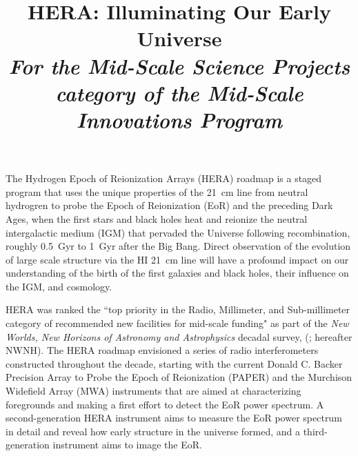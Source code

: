 \documentclass[preprint]{aastex}
\def\HI{{H{\small I }}}
\begin{document}
\title{HERA: Illuminating Our Early Universe\\
{\it For the Mid-Scale Science Projects category of the Mid-Scale Innovations Program}} 



{ \setlength{\parindent}{0cm}
The Hydrogen Epoch of Reionization Arrays (HERA) roadmap is a staged
program that uses the unique properties of the 21~cm line from neutral
hydrogren to probe the 
Epoch of Reionization (EoR) and the preceding Dark Ages,
when the first stars and black holes heat and reionize the
neutral intergalactic medium (IGM) that pervaded the Universe following recombination, roughly
0.5~Gyr to 1~Gyr after the Big Bang. Direct observation of the evolution of
large scale structure via the \HI 21~cm line will have a profound impact on our
understanding of the birth of the first galaxies and black holes, their
influence on the IGM, and cosmology.}  

HERA was ranked the ``top priority in the Radio, Millimeter, and Sub-millimeter
category of recommended new facilities for mid-scale funding" as part of the
{\it New Worlds, New Horizons of Astronomy and Astrophysics} decadal survey,
(\citealt{astro2010}; hereafter NWNH).  
The HERA roadmap envisioned a series of
radio interferometers constructed throughout the decade, starting with the current
Donald C. Backer Precision Array to Probe the Epoch of Reionization (PAPER) and 
the Murchison Widefield Array (MWA) instruments 
that are aimed at characterizing
foregrounds and making a first effort to detect the EoR power
spectrum. A second-generation HERA instrument aims to measure the EoR power spectrum in
detail and reveal how early structure in the universe formed, and a
third-generation instrument aims to image the EoR. 
\end{document}
